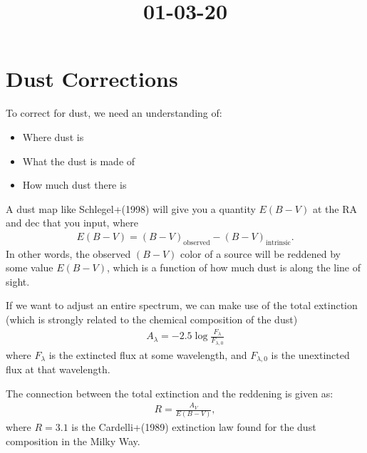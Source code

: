 \documentclass[12pt]{article}
\begin{document}
\title{01-03-20}
\author{}
\maketitle

\section{Dust Corrections}
To correct for dust, we need an understanding of:
\begin{itemize}
    \item Where dust is
    \item What the dust is made of
    \item How much dust there is
\end{itemize}

A dust map like Schlegel+(1998) will give you a quantity $E(B-V)$ at the RA and dec that you input, where
\begin{align}
    E(B-V) = (B - V)_{\text{observed}} - (B - V)_{\text{intrinsic}}.
\end{align}
In other words, the observed $(B-V)$ color of a source will be reddened by some value $E(B-V)$, which is a function of how much dust is along the line of sight.

If we want to adjust an entire spectrum, we can make use of the total extinction (which is strongly related to the chemical composition of the dust)
\begin{align}
    A_\lambda = -2.5 \log \frac{F_\lambda}{F_{\lambda,0}}
\end{align}
where $F_{\lambda}$ is the extincted flux at some wavelength, and $F_{\lambda,0}$ is the unextincted flux at that wavelength.

The connection between the total extinction and the reddening is given as:
\begin{align}
    R = \frac{A_V}{E(B-V)},
\end{align}
where $R = 3.1$ is the Cardelli+(1989) extinction law found for the dust composition in the Milky Way.
\end{document}
